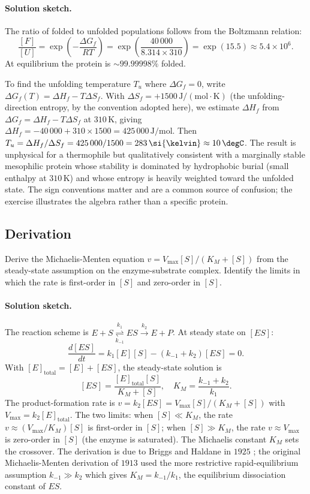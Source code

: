 \paragraph{Solution sketch.}
The ratio of folded to unfolded populations follows from the
Boltzmann relation:
\[
\frac{[F]}{[U]} = \exp\left(-\frac{\Delta G_f}{RT}\right)
= \exp\left(\frac{40\,000}{8.314 \times 310}\right)
= \exp(15.5) \approx 5.4 \times 10^{6}.
\]
At equilibrium the protein is $\sim 99.99998\%$ folded.

To find the unfolding temperature $T_u$ where $\Delta G_f = 0$, write
$\Delta G_f(T) = \Delta H_f - T \Delta S_f$. With $\Delta S_f =
+1500\,\text{J}/(\text{mol}\cdot\si{\kelvin})$ (the unfolding-direction
entropy, by the convention adopted here), we estimate $\Delta H_f$
from $\Delta G_f = \Delta H_f - T \Delta S_f$ at $310\,\si{\kelvin}$,
giving $\Delta H_f = -40\,000 + 310 \times 1500 =
425\,000\,\text{J}/\text{mol}$. Then $T_u = \Delta H_f / \Delta S_f =
425\,000 / 1500 = 283\,\si{\kelvin} \approx 10\,\degC$. The result
is unphysical for a thermophile but qualitatively consistent with a
marginally stable mesophilic protein whose stability is dominated by
hydrophobic burial (small enthalpy at $310\,\si{\kelvin}$) and whose
entropy is heavily weighted toward the unfolded state. The sign
conventions matter and are a common source of confusion; the
exercise illustrates the algebra rather than a specific protein.

\subsection*{Derivation}

\begin{exercise}
Derive the Michaelis-Menten equation $v = V_{\max}[S]/(K_M + [S])$
from the steady-state assumption on the enzyme-substrate complex.
Identify the limits in which the rate is first-order in $[S]$ and
zero-order in $[S]$.
\end{exercise}

\paragraph{Solution sketch.}
The reaction scheme is
$E + S \overset{k_1}{\underset{k_{-1}}{\rightleftharpoons}} ES
\overset{k_2}{\rightarrow} E + P$.
At steady state on $[ES]$:
\[
\frac{d[ES]}{dt} = k_1 [E][S] - (k_{-1} + k_2)[ES] = 0.
\]
With $[E]_{\text{total}} = [E] + [ES]$, the steady-state solution is
\[
[ES] = \frac{[E]_{\text{total}}[S]}{K_M + [S]},
\quad K_M = \frac{k_{-1} + k_2}{k_1}.
\]
The product-formation rate is $v = k_2 [ES] = V_{\max}[S]/(K_M + [S])$
with $V_{\max} = k_2 [E]_{\text{total}}$. The two limits:
when $[S] \ll K_M$, the rate $v \approx (V_{\max}/K_M)[S]$ is
first-order in $[S]$; when $[S] \gg K_M$, the rate $v \approx V_{\max}$
is zero-order in $[S]$ (the enzyme is saturated). The Michaelis
constant $K_M$ sets the crossover. The derivation is due to
Briggs and Haldane in $1925$ \cite{paper:v6c04-briggs-haldane-1925};
the original Michaelis-Menten derivation of $1913$ used the more
restrictive rapid-equilibrium assumption $k_{-1} \gg k_2$ which
gives $K_M = k_{-1}/k_1$, the equilibrium dissociation constant of
$ES$.

